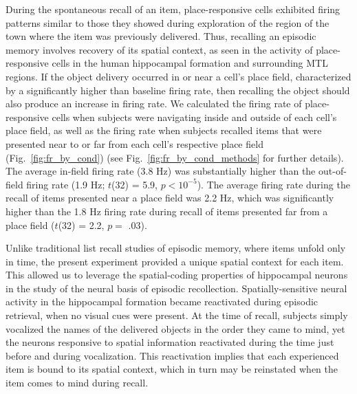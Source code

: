 During the spontaneous recall of an item, place-responsive cells exhibited firing patterns similar to those they showed during exploration of the region of the town where the item was previously delivered.  Thus, recalling an episodic memory involves recovery of its spatial context, as seen in the activity of place-responsive cells in the human hippocampal formation and surrounding MTL regions. If the object delivery occurred in or near a cell's place field, characterized by a significantly higher than baseline firing rate, then recalling the object should also produce an increase in firing rate. We calculated the firing rate of place-responsive cells when subjects were navigating inside and outside of each cell's place field, as well as the firing rate when subjects recalled items that were presented near to or far from each cell's respective place field (Fig.~\ref{fig:fr_by_cond}) (see Fig.~\ref{fig:fr_by_cond_methods} for further details).  The average in-field firing rate (3.8 Hz) was substantially higher than the out-of-field firing rate  (1.9 Hz; $t$(32) = 5.9, $p < 10^{-5}$).  The average firing rate during the recall of items presented near a place field was 2.2 Hz, which was significantly higher than the 1.8 Hz firing rate during recall of items presented far from a place field ($t$(32) = 2.2, $p =$ .03).


Unlike traditional list recall studies of episodic memory, where items unfold only in time, the present experiment provided a unique spatial context for each item.  This allowed us to leverage the  spatial-coding properties of hippocampal neurons in the study of the neural basis of episodic recollection.  Spatially-sensitive neural activity in the hippocampal formation became reactivated during episodic retrieval, when no visual cues were present.  At the time of recall, subjects simply vocalized the names of the delivered objects in the order they came to mind, yet the neurons responsive to spatial  information reactivated during the time just before and during vocalization.  This reactivation implies  that  each experienced item is bound to its spatial context, which in turn may be reinstated when the item comes to mind during recall.  

